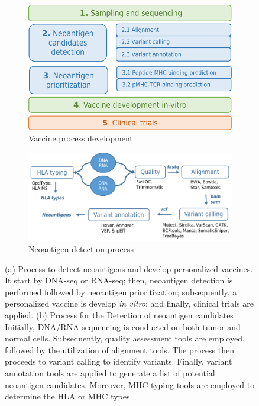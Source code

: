 \begin{figure}[h]
	
	\begin{subfigure}[b]{0.4\textwidth}
		\centering
		\includegraphics[width=\textwidth]{../img/proposal/vaccine_pipeline}
		\caption{Vaccine process development}
		\label{fig:pipeline_a}
	\end{subfigure}
	\hfill
	\begin{subfigure}[b]{0.55\textwidth}
		\centering
		\includegraphics[width=\textwidth]{../img/proposal/neoantigen_detection}
		\caption{Neoantigen detection process}
		\label{fig:pipeline_b}
	\end{subfigure}
	\hfill
	
	\caption{(a) Process to detect neoantigens and develop personalized vaccines. It start by DNA-seq or RNA-seq; then, neoantigen detection is performed followed by neoantigen prioritization; subsequently, a personalized vaccine is develop \textit{in vitro}; and finally, clinical trials are applied. (b) Process for the Detection of neoantigen candidates Initially, DNA/RNA sequencing is conducted on both tumor and normal cells. Subsequently, quality assessment tools are employed, followed by the utilization of alignment tools. The process then proceeds to variant calling to identify variants. Finally, variant annotation tools are applied to generate a list of potential neoantigen candidates. Moreover, MHC typing tools are employed to determine the HLA or MHC types.}
	\label{fig:pipeline}
\end{figure}

